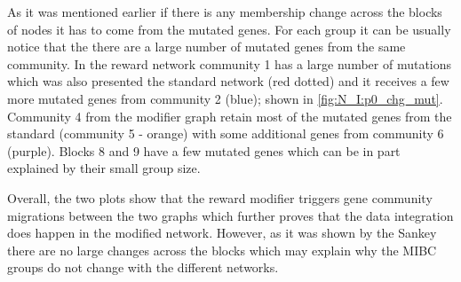 As it was mentioned earlier if there is any membership change across the blocks of nodes it has to come from the mutated genes. For each group it can be usually notice that the there are a large number of mutated genes from the same community. In the reward network community 1 has a large number of mutations which was also presented the standard network (red dotted) and it receives a few more mutated genes from community 2 (blue); shown in \cref{fig:N_I:p0_chg_mut}. Community 4 from the modifier graph retain most of the mutated genes from the standard (community 5 - orange) with some additional genes from community 6 (purple). Blocks 8 and 9 have a few mutated genes which can be in part explained by their small group size. 

Overall, the two plots show that the reward modifier triggers gene community migrations between the two graphs which further proves that the data integration does happen in the modified network. However, as it was shown by the Sankey there are no large changes across the blocks which may explain why the MIBC groups do not change with the different networks.

